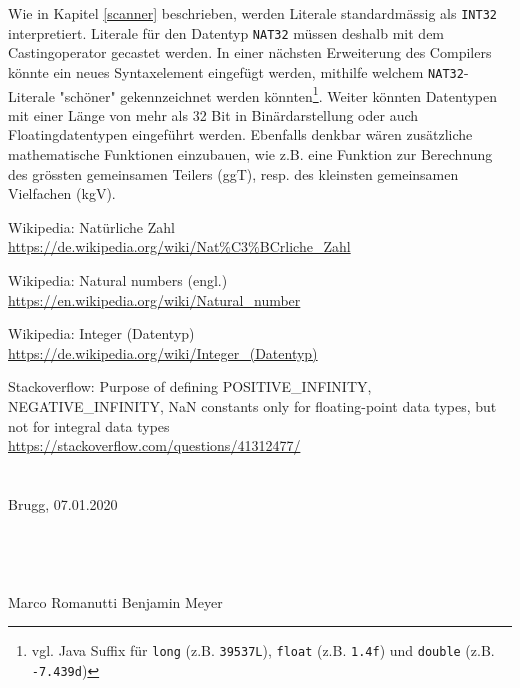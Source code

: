 \documentclass[10pt, a4paper, twocolumn]{article} %
\begin{document}
Wie in Kapitel \ref{scanner} beschrieben, werden Literale standardmässig als \texttt{INT32} interpretiert.
Literale für den Datentyp \texttt{NAT32} müssen deshalb mit dem Castingoperator gecastet werden.
In einer nächsten Erweiterung des Compilers könnte ein neues Syntaxelement eingefügt werden, mithilfe welchem \texttt{NAT32}-Literale "schöner" gekennzeichnet werden könnten\footnote{vgl. Java Suffix für \texttt{long} (z.B. \texttt{39537L}), \texttt{float} (z.B. \texttt{1.4f}) und \texttt{double} (z.B. \texttt{-7.439d})}.
Weiter könnten Datentypen mit einer Länge von mehr als 32 Bit in Binärdarstellung oder auch Floatingdatentypen eingeführt werden.
Ebenfalls denkbar wären zusätzliche mathematische Funktionen einzubauen, wie z.B. eine Funktion zur Berechnung des grössten gemeinsamen Teilers (ggT), resp. des kleinsten gemeinsamen Vielfachen (kgV).

\begin{thebibliography}{9}
    Wikipedia: Natürliche Zahl\\
    \url{https://de.wikipedia.org/wiki/Nat\%C3\%BCrliche_Zahl}

    Wikipedia: Natural numbers (engl.)\\
    \url{https://en.wikipedia.org/wiki/Natural_number}

    Wikipedia: Integer (Datentyp)\\
    \url{https://de.wikipedia.org/wiki/Integer_(Datentyp)}

    Stackoverflow: Purpose of defining POSITIVE\_INFINITY, NEGATIVE\_INFINITY, NaN constants only for floating-point data types, but not for integral data types\\
    \url{https://stackoverflow.com/questions/41312477/}
\end{thebibliography}

\clearpage
\section*{}
\vspace{18cm}
Brugg, 07.01.2020
\\
\\
\\
\\
\\
Marco Romanutti \hfill Benjamin Meyer
\end{document}
